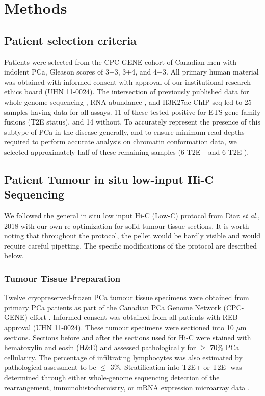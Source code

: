 \section{Methods}

\subsection{Patient selection criteria}

Patients were selected from the CPC-GENE cohort of Canadian men with indolent PCa, Gleason scores of 3+3, 3+4, and 4+3.
All primary human material was obtained with informed consent with approval of our institutional research ethics board (UHN 11-0024).
The intersection of previously published data for whole genome sequencing \cite{fraserGenomicHallmarksLocalized2017}, RNA abundance \cite{chenWidespreadFunctionalRNA2019}, and H3K27ac ChIP-seq \cite{kronTMPRSS2ERGFusion2017} led to 25 samples having data for all assays.
11 of these tested positive for ETS gene family fusions (T2E status), and 14 without.
To accurately represent the presence of this subtype of PCa in the disease generally, and to ensure minimum read depths required to perform accurate analysis on chromatin conformation data, we selected approximately half of these remaining samples (6 T2E+ and 6 T2E-).

\subsection{Patient Tumour in situ low-input Hi-C Sequencing}

We followed the general in situ low input Hi-C (Low-C) protocol from Diaz \emph{et al.}, 2018 \cite{diazChromatinConformationAnalysis2018} with our own re-optimization for solid tumour tissue sections.
It is worth noting that throughout the protocol, the pellet would be hardly visible and would require careful pipetting.
The specific modifications of the protocol are described below.

\subsubsection{Tumour Tissue Preparation}

Twelve cryopreserved-frozen PCa tumour tissue specimens were obtained from primary PCa patients as part of the Canadian PCa Genome Network (CPC-GENE) effort \cite{fraserGenomicHallmarksLocalized2017}.
Informed consent was obtained from all patients with REB approval (UHN 11-0024).
These tumour specimens were sectioned into 10 $\mu$m sections.
Sections before and after the sections used for Hi-C were stained with hematoxylin and eosin (H\&E) and assessed pathologically for $\ge$ 70\% PCa cellularity.
The percentage of infiltrating lymphocytes was also estimated by pathological assessment to be $\le$ 3\%.
Stratification into T2E+ or T2E- was determined through either whole-genome sequencing detection of the rearrangement, immunohistochemistry, or mRNA expression microarray data \cite{fraserGenomicHallmarksLocalized2017}.

